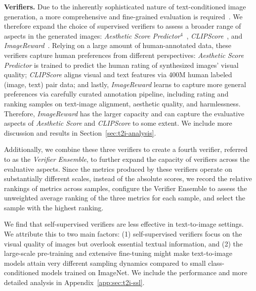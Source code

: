 \textbf{Verifiers.} Due to the inherently sophisticated nature of text-conditioned image generation, a more comprehensive and fine-grained evaluation is required~\citep{lee2024holistic}. We therefore expand the choice of supervised verifiers to assess a broader range of aspects in the generated images: \textit{Aesthetic Score Predictor}$^4$~\citep{schuhmann2022laion}, \textit{CLIPScore}~\citep{hessel2021clipscore}, and \textit{ImageReward}~\citep{xu2024imagereward}. Relying on a large amount of human-annotated data, these verifiers capture human preferences from different perspectives: \textit{Aesthetic Score Predictor} is trained to predict the human rating of synthesized images' visual quality; \textit{CLIPScore} aligns visual and text features via 400M human labeled (image, text) pair data; and lastly, \textit{ImageReward} learns to capture more general preferences via carefully curated annotation pipeline, including rating and ranking samples on text-image alignment, aesthetic quality, and harmlessness. Therefore, \textit{ImageReward} has the larger capacity and can capture the evaluative aspects of \textit{Aesthetic Score} and \textit{CLIPScore} to some extent. We include more discussion and results in Section~\ref{sec:t2i-analysis}.


\thispagestyle{footnote4}


Additionally, we combine these three verifiers to create a fourth verifier, referred to as the \textit{Verifier Ensemble}, to further expand the capacity of verifiers across the evaluative aspects. Since the metrics produced by these verifiers operate on substantially different scales, instead of the absolute scores, we record the relative rankings of metrics across samples, configure the Verifier Ensemble to assess the unweighted average ranking of the three metrics for each sample, and select the sample with the highest ranking. 


We find that self-supervised verifiers are less effective in text-to-image settings. We attribute this to two main factors: (1) self-supervised verifiers focus on the visual quality of images but overlook essential textual information, and (2) the large-scale pre-training and extensive fine-tuning might make text-to-image models attain very different sampling dynamics compared to small class-conditioned models trained on ImageNet. We include the performance and more detailed analysis in Appendix~\ref{app:sec:t2i-ssl}.



